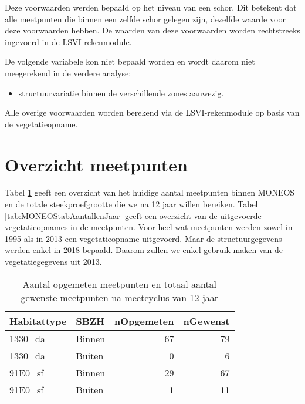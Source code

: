 \documentclass[twoside]{extreport}
\begin{document}
Deze voorwaarden werden bepaald op het niveau van een schor. Dit
betekent dat alle meetpunten die binnen een zelfde schor gelegen zijn,
dezelfde waarde voor deze voorwaarden hebben. De waarden van deze
voorwaarden worden rechtstreeks ingevoerd in de LSVI-rekenmodule.

De volgende variabele kon niet bepaald worden en wordt daarom niet
meegerekend in de verdere analyse:

\begin{itemize}
\tightlist
\item
  structuurvariatie binnen de verschillende zones aanwezig.
\end{itemize}

Alle overige voorwaarden worden berekend via de LSVI-rekenmodule op
basis van de vegetatieopname.

\section{Overzicht meetpunten}\label{overzicht-meetpunten-2}

Tabel \ref{tab:MONEOStabAantallen} geeft een overzicht van het huidige
aantal meetpunten binnen MONEOS en de totale steekproefgrootte die we na
12 jaar willen bereiken. Tabel \ref{tab:MONEOStabAantallenJaar} geeft
een overzicht van de uitgevoerde vegetatieopnames in de meetpunten. Voor
heel wat meetpunten werden zowel in 1995 als in 2013 een vegetatieopname
uitgevoerd. Maar de structuurgegevens werden enkel in 2018 bepaald.
Daarom zullen we enkel gebruik maken van de vegetatiegegevens uit 2013.

\begin{table}[!h]

\caption{\label{tab:MONEOStabAantallen}Aantal opgemeten meetpunten en totaal aantal gewenste meetpunten na meetcyclus van 12 jaar}
\centering
\begin{tabular}{llrr}
\toprule
Habitattype & SBZH & nOpgemeten & nGewenst\\
\midrule
1330\_da & Binnen & 67 & 79\\
1330\_da & Buiten & 0 & 6\\
91E0\_sf & Binnen & 29 & 67\\
91E0\_sf & Buiten & 1 & 11\\
\bottomrule
\end{tabular}
\end{table}
\end{document}
